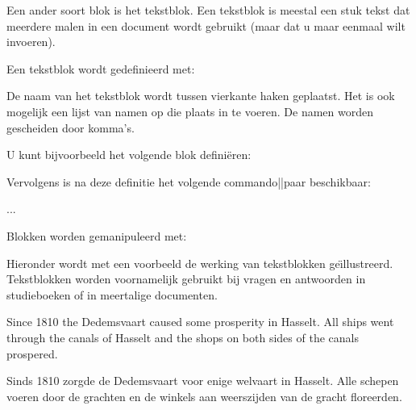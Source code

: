 \start
\haalbuffer
\stop




Een ander soort blok is het tekstblok. Een tekstblok is
meestal een stuk tekst dat meerdere malen in een document
wordt gebruikt (maar dat u maar eenmaal wilt invoeren).

Een tekstblok wordt gedefinieerd met:


De naam van het tekstblok wordt tussen vierkante haken
geplaatst. Het is ook mogelijk een lijst van namen op die
plaats in te voeren. De namen worden gescheiden door komma's.

U kunt bijvoorbeeld het volgende blok defini\"eren:

\starttypen
{}
\stoptypen

Vervolgens is na deze definitie het volgende commando||paar
beschikbaar:

\starttypen
\beginvannederlands ... \eindvannederlands
\stoptypen

Blokken worden gemanipuleerd met:


Hieronder wordt met een voorbeeld de werking van
tekstblokken ge\"{\i}llustreerd. Tekstblokken worden voornamelijk
gebruikt bij vragen en antwoorden in studieboeken of in
meertalige documenten.

\startbuffer
{}


\beginvanengels[dedemsvaart-e]
Since 1810 the Dedemsvaart caused some prosperity in Hasselt. All
ships went through the canals of Hasselt and the shops on both
sides of the canals prospered.
\eindvanengels

\beginvannederlands[dedemsvaart-n]
Sinds 1810 zorgde de Dedemsvaart voor enige welvaart in Hasselt.
Alle schepen voeren door de grachten en de winkels aan weerszijden
van de gracht floreerden.
\eindvannederlands

\gebruikblokken[engels][dedemsvaart-e]
\stopbuffer

\typebuffer

